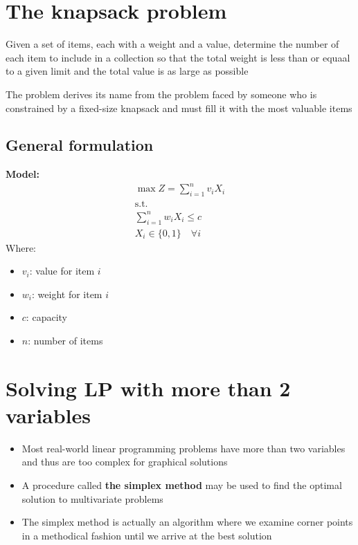 \documentclass[10pt]{article}
\begin{document}
\section{The knapsack problem}
Given a set of items, each with a weight and a value, determine the number of each item to include in a collection so that the total weight is less than or equaal to a given limit and the total value is as large as possible 

The problem derives its name from the problem faced by someone who is constrained by a fixed-size knapsack and must fill it with the most valuable items 
\subsection{General formulation}
\textbf{Model:}
\begin{gather*}
    \max Z = \sum_{i = 1}^{n}v_iX_i\\
    \text{s.t.}\\
    \sum_{i = 1}^{n}w_iX_i \le c \\
    X_i\in\{0, 1\}\quad\forall i
\end{gather*}
Where: 
\begin{itemize}
    \item $v_i $: value for item $i $
    \item $w_i $: weight for item $i $
    \item $c $: capacity
    \item $n $: number of items
\end{itemize}
\section{Solving LP with more than 2 variables}
\begin{itemize}
    \item Most real-world linear programming problems have more than two variables and thus are too complex for graphical solutions
    \item A procedure called \textbf{the simplex method} may be used to find the optimal solution to multivariate problems 
    \item The simplex method is actually an algorithm where we examine corner points in a methodical fashion until we arrive at the best solution 
\end{itemize}
\newpage 
\end{document}
